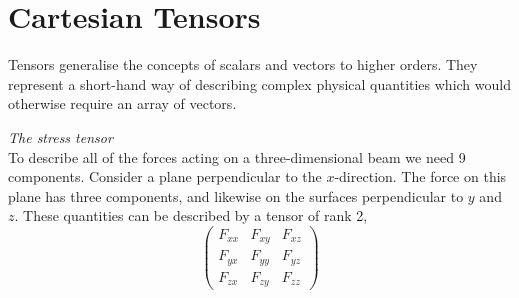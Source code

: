 \documentclass{mn2e}
\begin{document}
\section{Cartesian Tensors}
\label{sec:carttensor}

Tensors generalise the concepts of scalars and vectors to higher
orders. They represent a short-hand way of describing complex physical
quantities which would otherwise require an array of vectors.
\begin{example}
  \emph{The stress tensor}     \\
  To describe all of the forces acting on a three-dimensional beam we
  need 9 components.  Consider a plane perpendicular to the
  $x$-direction. The force on this plane has three components, and
  likewise on the surfaces perpendicular to $y$ and $z$. These
  quantities can be described by a tensor of rank 2,
  \begin{equation*}
    \begin{pmatrix}
      F_{xx} & F_{xy} & F_{xz} \\
      F_{yx} & F_{yy} & F_{yz} \\
      F_{zx} & F_{zy} & F_{zz}
    \end{pmatrix}
  \end{equation*}
\end{example}
\end{document}
